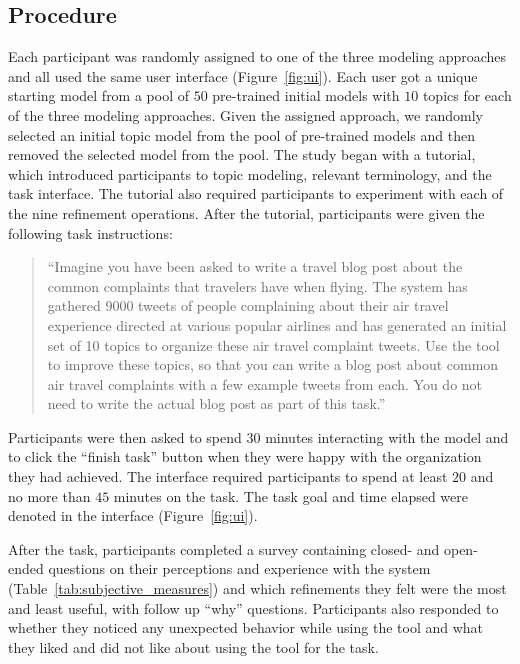 \subsection{Procedure}
\label{sec:procedure}
Each participant was randomly assigned to one of the three
modeling approaches and all used the same \hltm{}
user interface (Figure~\ref{fig:ui}). 
Each user got a unique starting model from a pool of $50$ pre-trained initial \lda{} models with $10$
topics for each of the three \hltm{} modeling approaches. 
Given the assigned approach, we randomly selected an initial topic model from the pool
of pre-trained models and then removed the selected model from the
pool. 
The study began with a tutorial, which introduced participants to topic modeling, relevant terminology, and the task interface. The tutorial also required participants to experiment with each of the nine refinement operations. 
After the tutorial, participants were given the following task instructions: 
\begin{quote}
    ``Imagine you have been asked to write a travel blog post about the common complaints that travelers have when flying. The system has gathered 9000 tweets of people complaining about their air travel experience directed at various popular airlines and has generated an initial set of 10 topics to organize these air travel complaint tweets. Use the tool to improve these topics, so that you can write a blog post about common air travel complaints with a few example tweets from each. You do not need to write the actual blog post as part of this task.''
\end{quote}

Participants were then asked to spend
$30$ minutes interacting with the model and to click the ``finish task'' button when they
were happy with the organization they had achieved. 
The interface required participants to spend at least $20$ and no more
than $45$ minutes on the task. 
The task goal and time elapsed were denoted in the interface
(Figure~\ref{fig:ui}).

After the task, participants completed a survey containing closed- and
open-ended questions on their perceptions and experience with the
system (Table~\ref{tab:subjective_measures}) and which refinements
they felt were the most and least useful, with follow up ``why''
questions. Participants also responded to whether they noticed any
unexpected behavior while using the tool and what they liked and did
not like about using the tool for the task.

